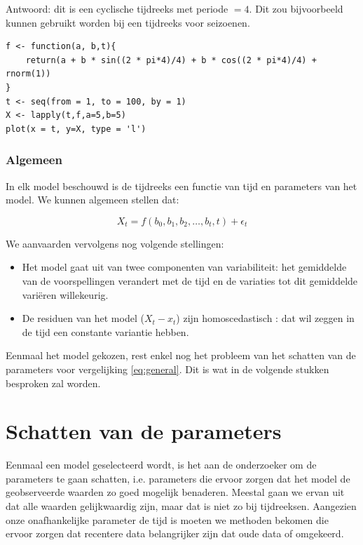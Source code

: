 Antwoord: dit is een cyclische tijdreeks met periode $= 4$. Dit zou bijvoorbeeld kunnen gebruikt worden bij een tijdreeks voor seizoenen. 

\begin{lstlisting}
f <- function(a, b,t){
	return(a + b * sin((2 * pi*4)/4) + b * cos((2 * pi*4)/4) + rnorm(1))
}
t <- seq(from = 1, to = 100, by = 1)
X <- lapply(t,f,a=5,b=5)
plot(x = t, y=X, type = 'l')
\end{lstlisting}

\subsubsection{Algemeen}

In elk model beschouwd is de tijdreeks een functie van tijd en parameters van het model. We kunnen algemeen stellen dat:

\begin{equation}
	X_{t} = f(b_{0}, b_{1}, b_{2}, \dots , b_{t}, t) + \epsilon_{t}
\label{eq:general}
\end{equation}

We aanvaarden vervolgens nog volgende stellingen:

\begin{itemize}
	\item Het model gaat uit van twee componenten van variabiliteit: het gemiddelde van de voorspellingen verandert met de tijd en de variaties tot dit gemiddelde variëren willekeurig.
	\item De residuen van het model ($X_{t} - x_{t}$) zijn homoscedastisch : dat wil zeggen in de tijd een constante variantie hebben.
\end{itemize}

Eenmaal het model gekozen, rest enkel nog het  probleem van het schatten van de parameters voor vergelijking \ref{eq:general}. Dit is wat in de volgende stukken besproken zal worden.

\section{Schatten van de parameters}

Eenmaal een model geselecteerd wordt, is het aan de onderzoeker om de parameters te gaan schatten, i.e. parameters die ervoor zorgen dat het model de geobserveerde waarden zo goed mogelijk benaderen. Meestal gaan we ervan uit dat alle waarden gelijkwaardig zijn, maar dat is niet zo bij tijdreeksen. Aangezien onze onafhankelijke parameter de tijd is moeten we methoden bekomen die ervoor zorgen dat recentere data belangrijker zijn dat oude data of omgekeerd. 

